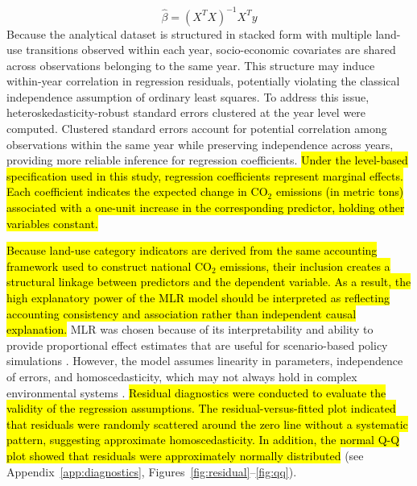 \documentclass[10pt,letterpaper]{article}
\begin{document}
\begin{equation}
	\hat{\beta} = (X^T X)^{-1} X^T y
\end{equation}
Because the analytical dataset is structured in stacked form with multiple land-use transitions observed within each year, socio-economic covariates are shared across observations belonging to the same year. This structure may induce within-year correlation in regression residuals, potentially violating the classical independence assumption of ordinary least squares. To address this issue, heteroskedasticity-robust standard errors clustered at the year level were computed. Clustered standard errors account for potential correlation among observations within the same year while preserving independence across years, providing more reliable inference for regression coefficients.
\hl{Under the level-based specification used in this study, regression coefficients represent marginal effects. Each coefficient indicates the expected change in CO$_2$ emissions (in metric tons) associated with a one-unit increase in the corresponding predictor, holding other variables constant.}

\hl{Because land-use category indicators are derived from the same accounting framework used to construct national CO$_2$ emissions, their inclusion creates a structural linkage between predictors and the dependent variable. As a result, the high explanatory power of the MLR model should be interpreted as reflecting accounting consistency and association rather than independent causal explanation.}
MLR was chosen because of its interpretability and ability to provide proportional effect estimates that are useful for scenario-based policy simulations \cite{dinca2025uk}. However, the model assumes linearity in parameters, independence of errors, and homoscedasticity, which may not always hold in complex environmental systems \cite{abdullah2017multiple}. \hl{Residual diagnostics were conducted to evaluate the validity of the regression assumptions. The residual-versus-fitted plot indicated that residuals were randomly scattered around the zero line without a systematic pattern, suggesting approximate homoscedasticity. In addition, the normal Q-Q plot showed that residuals were approximately normally 
distributed} (see Appendix~\ref{app:diagnostics}, Figures~\ref{fig:residual}--\ref{fig:qq}).
\end{document}
